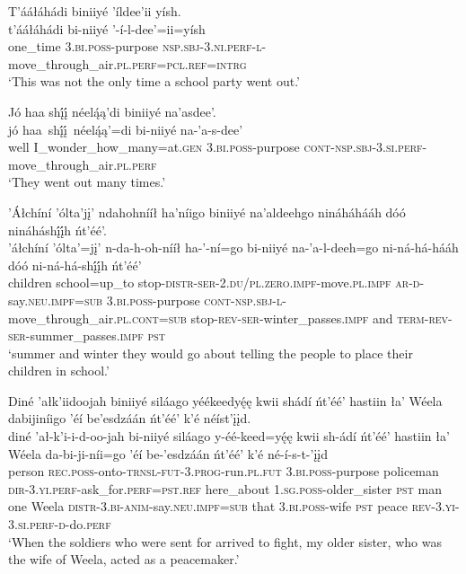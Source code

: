 \newpage
\ea\label{ex:text3-7-1}
T’ááłáhádi biniiyé ’íldee’ii yísh.\\
\gll t’ááłáhádi	bi-niiyé	’-í-l-dee’=ii=yísh\\
     one\_time	3.\textsc{bi}.\textsc{poss}-purpose	\textsc{nsp}.\textsc{sbj}-3.\textsc{ni}.\textsc{perf}-\textsc{l}-move\_through\_air.\textsc{pl}.\textsc{perf}=\textsc{pcl}.\textsc{ref}=\textsc{intrg}\\
\glt `This was not the only time a school party went out.'
\z

\ea\label{ex:text3-7-2}
Jó haa shį́į́ néelą́ą’di biniiyé na’asdee’.\\
\gll jó	haa~shį́į́~{néelą́ą’=di}	bi-niiyé	na-’a-s-dee’\\
     well	I\_wonder\_how\_many=at.\textsc{gen}	3.\textsc{bi}.\textsc{poss}-purpose	\textsc{cont}-\textsc{nsp}.\textsc{sbj}-3.\textsc{si}.\textsc{perf}-move\_through\_air.\textsc{pl}.\textsc{perf}\\
\glt `They went out many times.'
\z

\ea\label{ex:text3-7-3}
’Áłchíní ’ólta’jį’ ndahohnííł ha’níigo biniiyé na’aldeehgo nináháhááh dóó nináháshį́į́h ńt’éé’.\\
\gll ’áłchíní	’ólta’=jį’	n-da-h-oh-nííł	ha-’-ní=go	bi-niiyé	na-’a-l-deeh=go	ni-ná-há-hááh	dóó	ni-ná-há-shį́į́h	ńt’éé’\\
     children	school=up\_to	stop-\textsc{distr}-\textsc{ser}-2.\textsc{du}/\textsc{pl}.\textsc{zero}.\textsc{impf}-move.\textsc{pl}.\textsc{impf}	\textsc{ar}-\textsc{d}-say.\textsc{neu}.\textsc{impf}=\textsc{sub}	3.\textsc{bi}.\textsc{poss}-purpose	\textsc{cont}-\textsc{nsp}.\textsc{sbj}-\textsc{l}-move\_through\_air.\textsc{pl}.\textsc{cont}=\textsc{sub}	stop-\textsc{rev}-\textsc{ser}-winter\_passes.\textsc{impf}	and	\textsc{term}-\textsc{rev}-\textsc{ser}-summer\_passes.\textsc{impf}	\textsc{pst}\\
\glt `summer and winter they would go about telling the people to place their children in school.'
\z

\ea\label{ex:text3-8-1}
Diné ’ałk’iidoojah biniiyé siláago yéékeedyę́ę kwii shádí ńt’éé’ hastiin ła’ Wéela dabijiníigo ’éí be’esdzáán ńt’éé’ k’é néíst’įįd.\\
\gll diné	’ał-k’i-i-d-oo-jah	bi-niiyé	siláago	y-éé-keed=yę́ę	kwii	sh-ádí	ńt’éé’	hastiin	ła’	Wéela	da-bi-ji-níi=go	’éí	be-’esdzáán	ńt’éé’	k’é	né-í-s-t-’įįd\\
     person	\textsc{rec}.\textsc{poss}-onto-\textsc{trnsl}-\textsc{fut}-3.\textsc{prog}-run.\textsc{pl}.\textsc{fut}	3.\textsc{bi}.\textsc{poss}-purpose	policeman	\textsc{dir}-3.\textsc{yi}.\textsc{perf}-ask\_for.\textsc{perf}=\textsc{pst}.\textsc{ref}	here\_about	1.\textsc{sg}.\textsc{poss}-older\_sister	\textsc{pst}	man	one	Weela	\textsc{distr}-3.\textsc{bi}-\textsc{anim}-say.\textsc{neu}.\textsc{impf}=\textsc{sub}	that	3.\textsc{bi}.\textsc{poss}-wife	\textsc{pst}	peace	\textsc{rev}-3.\textsc{yi}-3.\textsc{si}.\textsc{perf}-\textsc{d}-do.\textsc{perf}\\
\glt `When the soldiers who were sent for arrived to fight, my older sister, who was the wife of Weela, acted as a peacemaker.'
\z

